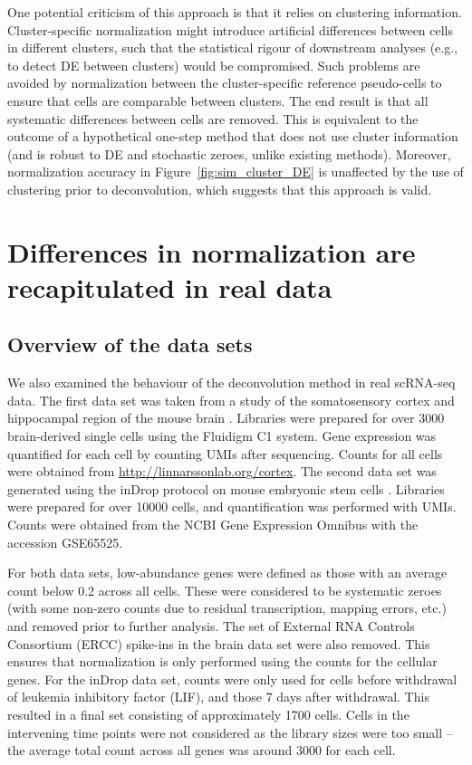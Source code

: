 \documentclass{article}
\begin{document}
One potential criticism of this approach is that it relies on clustering information.
Cluster-specific normalization might introduce artificial differences between cells in different clusters, 
    such that the statistical rigour of downstream analyses (e.g., to detect DE between clusters) would be compromised.
Such problems are avoided by normalization between the cluster-specific reference pseudo-cells to ensure that cells are comparable between clusters.
The end result is that all systematic differences between cells are removed.
This is equivalent to the outcome of a hypothetical one-step method that does not use cluster information (and is robust to DE and stochastic zeroes, unlike existing methods).
Moreover, normalization accuracy in Figure~\ref{fig:sim_cluster_DE} is unaffected by the use of clustering prior to deconvolution, which suggests that this approach is valid.

\section{Differences in normalization are recapitulated in real data}

\subsection{Overview of the data sets}
We also examined the behaviour of the deconvolution method in real scRNA-seq data.
The first data set was taken from a study of the somatosensory cortex and hippocampal region of the mouse brain \cite{zeisel2015brain}.
Libraries were prepared for over 3000 brain-derived single cells using the Fluidigm C1 system.
Gene expression was quantified for each cell by counting UMIs after sequencing.
Counts for all cells were obtained from \url{http://linnarssonlab.org/cortex}.
The second data set was generated using the inDrop protocol on mouse embryonic stem cells \cite{klein2015droplet}.
Libraries were prepared for over 10000 cells, and quantification was performed with UMIs.
Counts were obtained from the NCBI Gene Expression Omnibus with the accession GSE65525.

For both data sets, low-abundance genes were defined as those with an average count below 0.2 across all cells.
These were considered to be systematic zeroes (with some non-zero counts due to residual transcription, mapping errors, etc.) and removed prior to further analysis.
The set of External RNA Controls Consortium (ERCC) spike-ins in the brain data set were also removed.
This ensures that normalization is only performed using the counts for the cellular genes.
For the inDrop data set, counts were only used for cells before withdrawal of leukemia inhibitory factor (LIF), and those 7 days after withdrawal.
This resulted in a final set consisting of approximately 1700 cells.
Cells in the intervening time points were not considered as the library sizes were too small -- the average total count across all genes was around 3000 for each cell.
\end{document}
